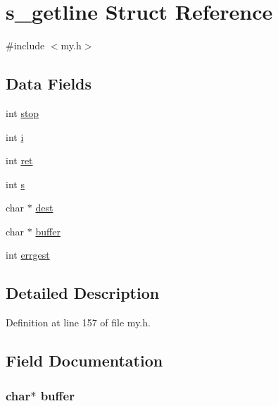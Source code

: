 \hypertarget{structs__getline}{\section{s\+\_\+getline Struct Reference}
\label{structs__getline}
}


{\ttfamily \#include $<$my.\+h$>$}

\subsection*{Data Fields}
\begin{DoxyCompactItemize}
\item 
int \hyperlink{structs__getline_a6c0af9f2e97842405fb15ed952ef2976}{stop}
\item 
int \hyperlink{structs__getline_acb559820d9ca11295b4500f179ef6392}{i}
\item 
int \hyperlink{structs__getline_a6baa346e44f4c2158d2be4f9b77b8203}{ret}
\item 
int \hyperlink{structs__getline_a339d22b3e442946380f98ed19e320db2}{s}
\item 
char $\ast$ \hyperlink{structs__getline_a21b0374bf8175befbde3cf5ad4831c04}{dest}
\item 
char $\ast$ \hyperlink{structs__getline_aff2566f4c366b48d73479bef43ee4d2e}{buffer}
\item 
int \hyperlink{structs__getline_a8311f37b86f9c9b158c003752ab54e84}{errgest}
\end{DoxyCompactItemize}


\subsection{Detailed Description}


Definition at line 157 of file my.\+h.



\subsection{Field Documentation}
\hypertarget{structs__getline_aff2566f4c366b48d73479bef43ee4d2e}{
\subsubsection[{buffer}]{\setlength{\rightskip}{0pt plus 5cm}char$\ast$ buffer}}\label{structs__getline_aff2566f4c366b48d73479bef43ee4d2e}


